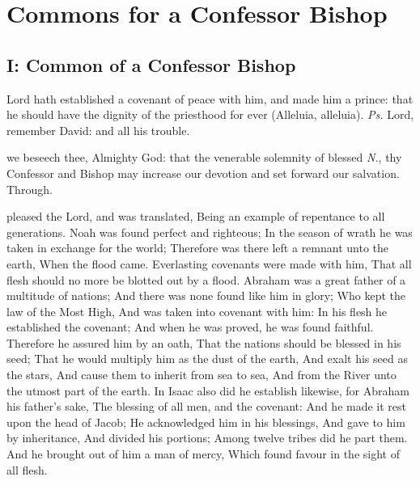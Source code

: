 \clearpage
\section{Commons for a Confessor Bishop}

\subsection{I: Common of a Confessor Bishop}\label{CommonConfessorBishopI}

\introit
{} Lord hath established a covenant of peace with him, and made him a prince: that he should have the dignity of the priesthood for ever (Alleluia, alleluia). \textit{Ps.} Lord, remember David: and all his trouble.

\collect\label{CommonConfessorBishopICollect}
 we beseech thee, Almighty God: that the venerable solemnity of blessed \textit{N.}, thy Confessor and Bishop may increase our devotion and set forward our salvation. Through.

 pleased the Lord, and was translated, Being an example of repentance to all generations. Noah was found perfect and righteous; In the season of wrath he was taken in exchange for the world; Therefore was there left a remnant unto the earth, When the flood came. Everlasting covenants were made with him, That all flesh should no more be blotted out by a flood. Abraham was a great father of a multitude of nations; And there was none found like him in glory; Who kept the law of the Most High, And was taken into covenant with him: In his flesh he established the covenant; And when he was proved, he was found faithful. Therefore he assured him by an oath, That the nations should be blessed in his seed; That he would multiply him as the dust of the earth, And exalt his seed as the stars, And cause them to inherit from sea to sea, And from the River unto the utmost part of the earth. In Isaac also did he establish likewise, for Abraham his father’s sake, The blessing of all men, and the covenant: And he made it rest upon the head of Jacob; He acknowledged him in his blessings, And gave to him by inheritance, And divided his portions; Among twelve tribes did he part them. And he brought out of him a man of mercy, Which found favour in the sight of all flesh.

